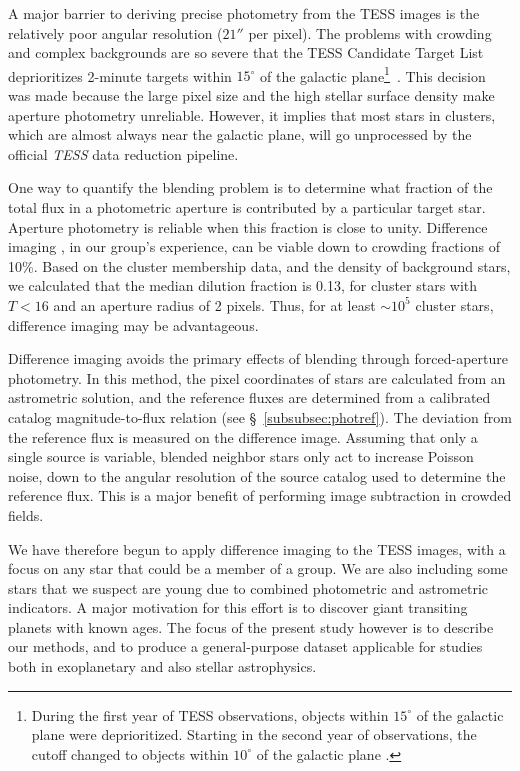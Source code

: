 \documentclass[12pt,twocolumn,tighten]{aastex62}
\begin{document}
A major barrier to deriving precise photometry from the TESS images is
the relatively poor angular resolution ($21''$ per pixel).   The
problems with crowding and complex backgrounds are so severe that the
TESS Candidate Target List deprioritizes 2-minute targets within
$15^\circ$ of the galactic plane\footnote{During the first year of
TESS observations, objects within $15^\circ$ of the galactic plane
were deprioritized. Starting in the second year of observations, the
cutoff changed to objects within $10^\circ$ of the galactic plane
\citep{stassun_TIC8_2019}.}~\citep{stassun_TIC_2018,stassun_TIC8_2019}.
This decision was made because the large pixel size and the high
stellar surface density make aperture photometry unreliable.  However,
it implies that most stars in clusters, which are almost always near
the galactic plane, will go unprocessed by the official {\it TESS}
data reduction pipeline.

One way to quantify the blending problem is to determine what fraction
of the total flux in a photometric aperture is contributed by a
particular target star. Aperture photometry is reliable when this
fraction is close to unity.  Difference imaging
\citep{Alard_Lupton_1998,miller_optimal_2008}, in our group's
experience, can be viable down to crowding fractions of 10\%.  Based
on the \citet{Kharchenko_et_al_2013} cluster membership data, and the
density of background stars, we calculated that the median dilution
fraction is 0.13, for cluster stars with $T< 16$ and an aperture
radius of 2 pixels.  Thus, for at least $\sim$$10^5$ cluster stars,
difference imaging may be advantageous.

Difference imaging avoids the primary effects of blending through
forced-aperture photometry.  In this method, the pixel coordinates of
stars are calculated from an astrometric solution, and the reference
fluxes are determined from a calibrated catalog magnitude-to-flux
relation (see \S~\ref{subsubsec:photref}).  The deviation from the
reference flux is measured on the difference image.  Assuming that
only a single source is variable, blended neighbor stars only act to
increase Poisson noise, down to the angular resolution of the source
catalog used to determine the reference flux.  This is a major benefit
of performing image subtraction in crowded fields.

We have therefore begun to apply difference imaging to the TESS
images, with a focus on any star that could be a member of a group.
We are also including some stars that we suspect are young due to
combined photometric and astrometric indicators.  A major motivation
for this effort is to discover giant transiting planets with known
ages.  The focus of the present study however is to describe our
methods, and to produce a general-purpose dataset applicable for
studies both in exoplanetary and also stellar astrophysics.
\end{document}
